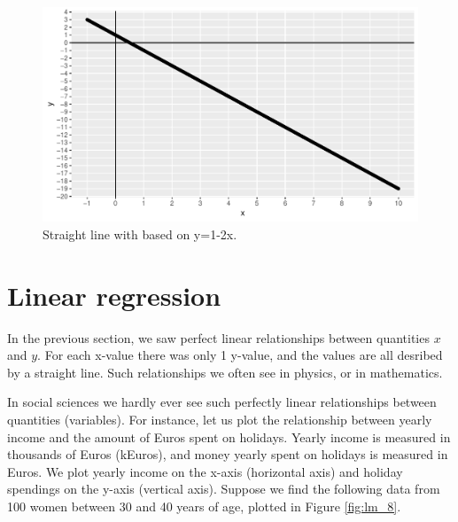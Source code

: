 \documentclass[]{report}\usepackage[]{graphicx}\usepackage[]{color}
\makeatletter
\def\maxwidth{ %
  \ifdim\Gin@nat@width>\linewidth
    \linewidth
  \else
    \Gin@nat@width
  \fi
}
\newenvironment{knitrout}{}{} %
\makeatother
\begin{document}
\begin{knitrout}
\color{fgcolor}\begin{figure}

{\centering \includegraphics[width=\maxwidth]{figure/lm_7-1} 

}

\caption[Straight line with based on y=1-2x]{Straight line with based on y=1-2x.}\label{fig:lm_7}
\end{figure}


\end{knitrout}

\section{Linear regression}

In the previous section, we saw perfect linear relationships between quantities $x$ and $y$. For each x-value there was only 1 y-value, and the values are all desribed by a straight line. Such relationships we often see in physics, or in mathematics.

In social sciences we hardly ever see such perfectly linear relationships between quantities (variables). For instance, let us plot the relationship between yearly income and the amount of Euros spent on holidays. Yearly income is measured in thousands of Euros (kEuros), and money yearly spent on holidays is measured in Euros. We plot yearly income on the x-axis (horizontal axis) and holiday spendings on the y-axis (vertical axis). Suppose we find the following data from 100 women between 30 and 40 years of age, plotted in Figure \ref{fig:lm_8}.
\end{document}

